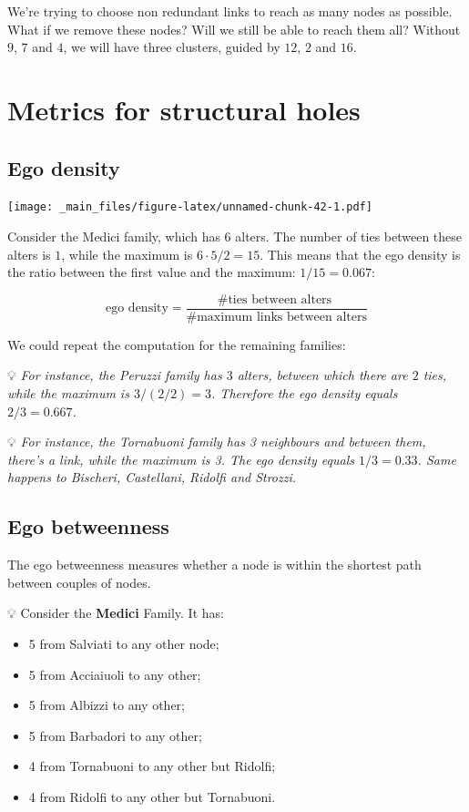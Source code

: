 \documentclass[
  notitlepage,
  onecolumn,
  openany]{book}
\providecommand{\tightlist}{%
  \setlength{\itemsep}{0pt}\setlength{\parskip}{0pt}}
\begin{document}
We're trying to choose non redundant links to reach as many nodes as
possible. What if we remove these nodes? Will we still be able to reach
them all? Without \(9\), \(7\) and \(4\), we will have three clusters, guided
by \(12\), \(2\) and \(16\).

\hypertarget{metrics-for-structural-holes}{%
\chapter{Metrics for structural holes}\label{metrics-for-structural-holes}}

\hypertarget{ego-density}{%
\section{Ego density}\label{ego-density}}

\texttt{[image: \_main\_files/figure-latex/unnamed-chunk-42-1.pdf]}

Consider the Medici family, which has \(6\) alters. The number of ties between these alters is \(1\), while the maximum is \(6\cdot 5/2 = 15\). This means that the ego density is the ratio between the first value and the maximum: \(1/15 = 0.067\):

\[
\text{ego density} = \frac{ \text{\# ties between alters }}{\text{\# maximum links between alters}}
\]

We could repeat the computation for the remaining families:

💡 \emph{For instance, the Peruzzi family has \(3\) alters, between which there are \(2\) ties, while the maximum is \(3/(2/2) = 3\). Therefore the ego density equals \(2/3 = 0.667\).}

💡 \emph{For instance, the Tornabuoni family has 3 neighbours and between them, there's a link, while the maximum is 3. The ego density equals \(1/3 = 0.33\). Same happens to Bischeri, Castellani, Ridolfi and Strozzi.}

\hypertarget{ego-betweenness}{%
\section{Ego betweenness}\label{ego-betweenness}}

The ego betweenness measures whether a node is within the shortest path between couples of nodes.

💡 Consider the \textbf{Medici} Family. It has:

\begin{itemize}
\tightlist
\item
  5 from Salviati to any other node;
\item
  5 from Acciaiuoli to any other;
\item
  5 from Albizzi to any other;
\item
  5 from Barbadori to any other;
\item
  4 from Tornabuoni to any other but Ridolfi;
\item
  4 from Ridolfi to any other but Tornabuoni.
\end{itemize}
\end{document}
